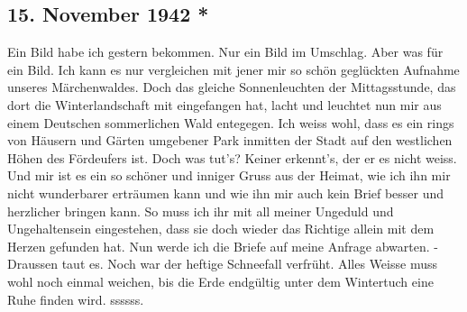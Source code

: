 \subsection{15. November 1942 *}

Ein Bild habe ich gestern bekommen.
Nur ein Bild im Umschlag.
Aber was f\"{u}r ein Bild.
Ich kann es nur vergleichen mit jener mir so sch\"{o}n gegl\"{u}ckten Aufnahme unseres M\"{a}rchenwaldes.
Doch das gleiche Sonnenleuchten der Mittagsstunde, das dort die Winterlandschaft mit eingefangen hat, lacht und leuchtet nun mir aus einem Deutschen sommerlichen Wald entegegen.
Ich weiss wohl, dass es ein rings von H\"{a}usern und G\"{a}rten umgebener Park inmitten der Stadt auf den westlichen H\"{o}hen des F\"{o}rdeufers ist.
Doch was tut's?
Keiner erkennt's, der er es nicht weiss.
Und mir ist es ein so sch\"{o}ner und inniger Gruss aus der Heimat, wie ich ihn mir nicht wunderbarer ertr\"{a}umen kann und wie ihn mir auch kein Brief besser und herzlicher bringen kann.
So muss ich ihr mit all meiner Ungeduld und Ungehaltensein eingestehen, dass sie doch wieder das Richtige allein mit dem Herzen gefunden hat.
Nun werde ich die Briefe auf meine Anfrage abwarten.
- Draussen taut es.
Noch war der heftige Schneefall verfr\"{u}ht.
Alles Weisse muss wohl noch einmal weichen, bis die Erde endg\"{u}ltig unter dem Wintertuch eine Ruhe finden wird. ssssss.

\clearpage

